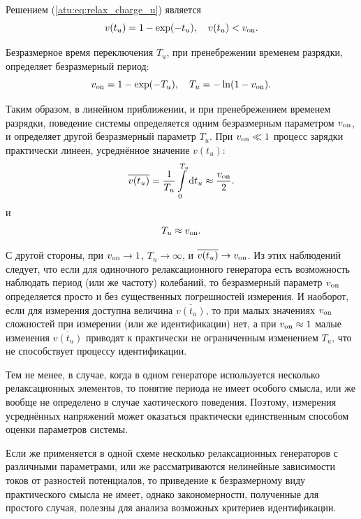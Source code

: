 Решением (\ref{atu:eq:relax_charge_u}) является
%
\begin{equation}
  v(t_u) = 1 - \exp( - t_u ) ,
  \quad
  v( t_u ) < v_\mathrm{on}.
  \label{atu:eq:relax_charge_u_solu}
\end{equation}

Безразмерное время переключения $T_u$,
при пренебрежении временем разрядки,
определяет безразмерный период:
%
\begin{equation}
  v_\mathrm{on} = 1 - \exp( - T_u ),
  \quad
  T_u = - \ln ( 1 - v_\mathrm{on} ).
  \label{atu:eq:T_u_relax}
\end{equation}

Таким образом, в линейном приближении, и при пренебрежением временем разрядки,
поведение системы определяется одним безразмерным параметром $v_\mathrm{on}$,
и определяет другой безразмерный параметр $T_u$.
При $v_\mathrm{on} \ll 1 $ процесс зарядки практически линеен,
усреднённое значение $v(t_u)$:
%
\begin{equation}
  \overline{v(t_u)} =
  \frac{1}{T_u}\int\limits_{0}^{T_u} \mathrm{d}t_u
  \approx
  \frac{v_\mathrm{on}}{ 2 }.
  \label{atu:eq:av_lin_relax}
\end{equation}
%
и
%
\begin{equation}
  T_u
  \approx
  v_\mathrm{on}.
  \label{atu:eq:T_u_lin_relax}
\end{equation}

С другой стороны, при $v_\mathrm{on} \to 1$, $T_u \to \infty$,
и
$ \overline{v(t_u)} \to v_\mathrm{on}$.
Из этих наблюдений следует, что если для одиночного релаксационного генератора
есть возможность наблюдать период (или же частоту) колебаний,
то безразмерный параметр $v_\mathrm{on}$ определяется просто и без
существенных погрешностей измерения. И наоборот,
если для измерения доступна величина $\overline{v(t_u)}$,
то при малых значениях $v_\mathrm{on}$ сложностей при измерении (или же идентификации) нет,
а при $v_\mathrm{on} \approx 1$ малые изменения $\overline{v(t_u)}$
приводят к практически не ограниченным изменением $T_u$,
что не способствует процессу идентификации.

Тем не менее, в случае, когда в одном генераторе используется
несколько релаксационных элементов,
то понятие периода не имеет особого смысла, или же вообще не
определено в случае хаотического поведения. Поэтому,
измерения усреднённых напряжений может оказаться практически
единственным способом оценки параметров системы.


Если же применяется в одной схеме несколько релаксационных генераторов с различными параметрами,
или же рассматриваются нелинейные зависимости токов от разностей потенциалов,
то приведение к безразмерному виду практического смысла не имеет,
однако закономерности, полученные для простого случая,
полезны для анализа возможных критериев идентификации.



